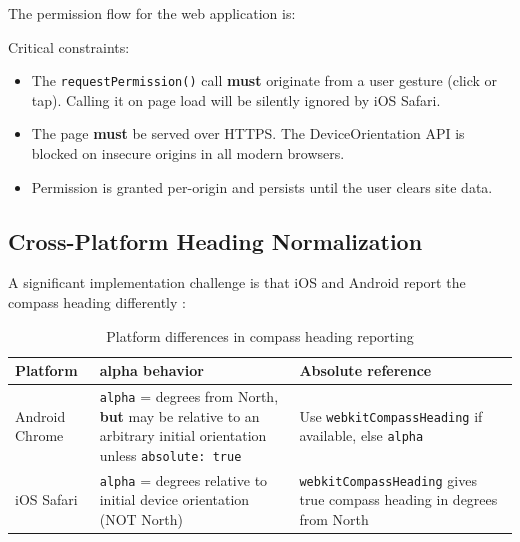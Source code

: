 The permission flow for the web application is:

\begin{algorithm}[H]
\caption{DeviceOrientation Permission Request Flow}
\label{alg:orientation-permission}
\SetAlgoLined

\BlankLine
{}

\BlankLine
{}
\end{algorithm}

Critical constraints:
\begin{itemize}
  \item The \texttt{requestPermission()} call \textbf{must} originate from a user gesture (click or tap). Calling it on page load will be silently ignored by iOS Safari.
  \item The page \textbf{must} be served over HTTPS. The DeviceOrientation API is blocked on insecure origins in all modern browsers.
  \item Permission is granted per-origin and persists until the user clears site data.
\end{itemize}

\subsection{Cross-Platform Heading Normalization}

A significant implementation challenge is that iOS and Android report the compass heading differently \cite{Mansour2021}:

\begin{table}[H]
\centering
\caption{Platform differences in compass heading reporting}
\begin{tabularx}{0.9\textwidth}{lXX}
\toprule
\textbf{Platform} & \textbf{alpha behavior} & \textbf{Absolute reference} \\
\midrule
Android Chrome & \texttt{alpha} = degrees from North, \textbf{but} may be relative to an arbitrary initial orientation unless \texttt{absolute: true} & Use \texttt{webkitCompassHeading} if available, else \texttt{alpha} \\
iOS Safari & \texttt{alpha} = degrees relative to initial device orientation (NOT North) & \texttt{webkitCompassHeading} gives true compass heading in degrees from North \\
\bottomrule
\end{tabularx}
\end{table}

